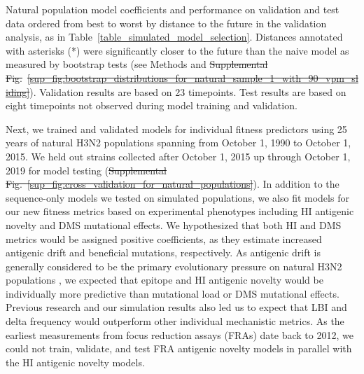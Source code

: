 \documentclass[9pt,lineno]{elife} %
\providecommand{\DIFadd}[1]{{\protect\color{blue}\uwave{#1}}} %
\providecommand{\DIFdel}[1]{{\protect\color{red}\sout{#1}}}                      %
\providecommand{\DIFaddbegin}{} %
\providecommand{\DIFaddend}{} %
\providecommand{\DIFdelbegin}{} %
\providecommand{\DIFdelend}{} %
\providecommand{\DIFaddFL}[1]{\DIFadd{#1}} %
\providecommand{\DIFdelFL}[1]{\DIFdel{#1}} %
\providecommand{\DIFaddbeginFL}{} %
\providecommand{\DIFaddendFL}{} %
\providecommand{\DIFdelbeginFL}{} %
\providecommand{\DIFdelendFL}{} %
\providecommand{\DIFaddtex}[1]{{\protect\color{blue}\uwave{#1}}} %
\providecommand{\DIFdeltex}[1]{{\protect\color{red}\sout{#1}}}                      %
\providecommand{\DIFaddbegin}{} %
\providecommand{\DIFaddend}{} %
\providecommand{\DIFdelbegin}{} %
\providecommand{\DIFdelend}{} %
\providecommand{\DIFaddFL}[1]{\DIFadd{#1}} %
\providecommand{\DIFdelFL}[1]{\DIFdel{#1}} %
\providecommand{\DIFaddbeginFL}{} %
\providecommand{\DIFaddendFL}{} %
\providecommand{\DIFdelbeginFL}{} %
\providecommand{\DIFdelendFL}{} %
\providecommand{\DIFadd}[1]{\texorpdfstring{\DIFaddtex{#1}}{#1}} %
\providecommand{\DIFdel}[1]{\texorpdfstring{\DIFdeltex{#1}}{}} %
\newcommand{\DIFscaledelfig}{0.5}
\newlength{\DIFdelgraphicswidth} %
\newlength{\DIFdelgraphicsheight} %
\newcommand{\DIFaddincludegraphics}[2][]{{\color{blue}\fbox{\DIFOincludegraphics[#1]{#2}}}} %
\newcommand{\DIFdelincludegraphics}[2][]{%
\sbox{\DIFdelgraphicsbox}{\DIFOincludegraphics[#1]{#2}}%
\settoboxwidth{\DIFdelgraphicswidth}{\DIFdelgraphicsbox} %
\settoboxtotalheight{\DIFdelgraphicsheight}{\DIFdelgraphicsbox} %
\scalebox{\DIFscaledelfig}{%
\parbox[b]{\DIFdelgraphicswidth}{\usebox{\DIFdelgraphicsbox}\\[-\baselineskip] \rule{\DIFdelgraphicswidth}{0em}}\llap{\resizebox{\DIFdelgraphicswidth}{\DIFdelgraphicsheight}{%
\setlength{\unitlength}{\DIFdelgraphicswidth}%
\begin{picture}(1,1)%
\thicklines\linethickness{2pt} %
{\color[rgb]{1,0,0}\put(0,0){\framebox(1,1){}}}%
{\color[rgb]{1,0,0}\put(0,0){\line( 1,1){1}}}%
{\color[rgb]{1,0,0}\put(0,1){\line(1,-1){1}}}%
\end{picture}%
}\hspace*{3pt}}} %
} %
\DeclareRobustCommand{\DIFaddbegin}{\DIFOaddbegin \let\includegraphics\DIFaddincludegraphics} %
\DeclareRobustCommand{\DIFaddend}{\DIFOaddend \let\includegraphics\DIFOincludegraphics} %
\DeclareRobustCommand{\DIFdelbegin}{\DIFOdelbegin \let\includegraphics\DIFdelincludegraphics} %
\DeclareRobustCommand{\DIFdelend}{\DIFOaddend \let\includegraphics\DIFOincludegraphics} %
\DeclareRobustCommand{\DIFaddbeginFL}{\DIFOaddbeginFL \let\includegraphics\DIFaddincludegraphics} %
\DeclareRobustCommand{\DIFaddendFL}{\DIFOaddendFL \let\includegraphics\DIFOincludegraphics} %
\DeclareRobustCommand{\DIFdelbeginFL}{\DIFOdelbeginFL \let\includegraphics\DIFdelincludegraphics} %
\DeclareRobustCommand{\DIFdelendFL}{\DIFOaddendFL \let\includegraphics\DIFOincludegraphics} %
\begin{document}
\begin{table}[htb]
\begin{center}
{    }
    \caption{
      Natural population model coefficients and performance on validation and test data ordered from best to worst by distance to the future in the validation analysis, as in Table~\ref{table_simulated_model_selection}.
      Distances annotated with asterisks (*) were significantly closer to the future than the naive model as measured by bootstrap tests (see Methods and \DIFdelbeginFL \DIFdelFL{Supplemental Fig.}\DIFdelendFL \DIFaddbeginFL \DIFaddFL{Figure}\DIFaddendFL ~\DIFdelbeginFL \DIFdelFL{\ref{sup_fig:bootstrap_distributions_for_natural_sample_1_with_90_vpm_sliding}}\DIFdelendFL \DIFaddbeginFL \DIFaddFL{\ref{fig:bootstrap_distributions_for_natural_sample_1_with_90_vpm_sliding}}\DIFaddendFL ).
      Validation results are based on 23 timepoints.
      Test results are based on eight timepoints not observed during model training and validation.
    }
    \label{table_natural_model_selection}
  \end{center}
\end{table}

Next, we trained and validated models for individual fitness predictors using 25 years of natural H3N2 populations spanning from October 1, 1990 to October 1, 2015.
We held out strains collected after October 1, 2015 up through October 1, 2019 for model testing (\DIFdelbegin \DIFdel{Supplemental Fig.~\ref{sup_fig:cross_validation_for_natural_populations}}\DIFdelend \DIFaddbegin \DIFadd{Figure~\ref{fig:cross_validation_for_natural_populations}}\DIFaddend ).
In addition to the sequence-only models we tested on simulated populations, we also fit models for our new fitness metrics based on experimental phenotypes including HI antigenic novelty and DMS mutational effects.
We hypothesized that both HI and DMS metrics would be assigned positive coefficients, as they estimate increased antigenic drift and beneficial mutations, respectively.
As antigenic drift is generally considered to be the primary evolutionary pressure on natural H3N2 populations \DIFdelbegin %
\DIFdelend \DIFaddbegin \citep{Smith:2004jc,Bedford:2014bf,Luksza:2014hj}\DIFaddend , we expected that epitope and HI antigenic novelty would be individually more predictive than mutational load or DMS mutational effects.
Previous research \DIFdelbegin %
\DIFdelend \DIFaddbegin \citep{Neher:2014eu} \DIFaddend and our simulation results also led us to expect that LBI and delta frequency would outperform other individual mechanistic metrics.
As the earliest measurements from focus reduction assays (FRAs) date back to 2012, we could not train, validate, and test FRA antigenic novelty models in parallel with the HI antigenic novelty models.
\end{document}
